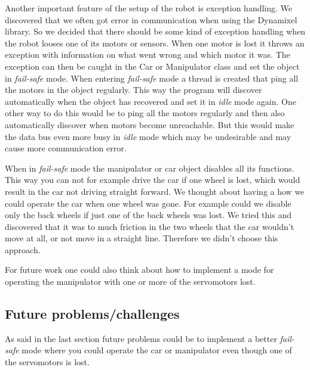 Another important feature of the setup of the robot is exception handling. We discovered that we often got error in communication when using the Dynamixel library. So we decided that there should be some kind of exception handling when the robot looses one of its motors or sensors. When one motor is lost it throws an exception with information on what went wrong and which motor it was. The exception can then be caught in the Car or Manipulator class and set the object in \textit{fail-safe} mode. When entering \textit{fail-safe} mode a thread is created that ping all the motors in the object regularly. This way the program will discover automatically when the object has recovered and set it in \textit{idle} mode again. One other way to do this would be to ping all the motors regularly and then also automatically discover when motors become unreachable. But this would make the data bus even more busy in \textit{idle} mode which may be undesirable and may cause more communication error.

When in \textit{fail-safe} mode the manipulator or car object disables all its functions. This way you can not for example drive the car if one wheel is lost, which would result in the car not driving straight forward. We thought about having a how we could operate the car when one wheel was gone. For example could we disable only the back wheels if just one of the back wheels was lost. We tried this and discovered that it was to much friction in the two wheels that the car wouldn't move at all, or not move in a straight line. Therefore we didn't choose this approach. 

For future work one could also think about how to implement a mode for operating the manipulator with one or more of the servomotors lost.

\subsection{Future problems/challenges}

As said in the last section future problems could be to implement a better \textit{fail-safe} mode where you could operate the car or manipulator even though one of the servomotors is lost.
\bigskip


